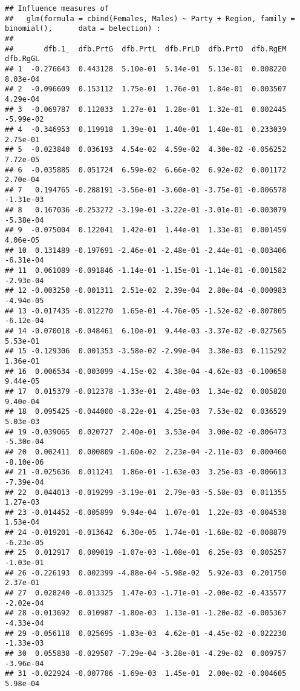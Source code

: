 \documentclass[
]{article}
\begin{document}
\begin{verbatim}
## Influence measures of
##   glm(formula = cbind(Females, Males) ~ Party + Region, family = binomial(),      data = belection) :
## 
##       dfb.1_  dfb.PrtG  dfb.PrtL  dfb.PrLD  dfb.PrtO  dfb.RgEM  dfb.RgGL
## 1  -0.276643  0.443128  5.10e-01  5.14e-01  5.13e-01  0.008220  8.03e-04
## 2  -0.096609  0.153112  1.75e-01  1.76e-01  1.84e-01  0.003507  4.29e-04
## 3  -0.069787  0.112033  1.27e-01  1.28e-01  1.32e-01  0.002445 -5.99e-02
## 4  -0.346953  0.119918  1.39e-01  1.40e-01  1.48e-01  0.233039  2.75e-01
## 5  -0.023840  0.036193  4.54e-02  4.59e-02  4.30e-02 -0.056252  7.72e-05
## 6  -0.035885  0.051724  6.59e-02  6.66e-02  6.92e-02  0.001172  2.70e-04
## 7   0.194765 -0.288191 -3.56e-01 -3.60e-01 -3.75e-01 -0.006578 -1.31e-03
## 8   0.167036 -0.253272 -3.19e-01 -3.22e-01 -3.01e-01 -0.003079 -5.38e-04
## 9  -0.075004  0.122041  1.42e-01  1.44e-01  1.33e-01  0.001459  4.06e-05
## 10  0.131489 -0.197691 -2.46e-01 -2.48e-01 -2.44e-01 -0.003406 -6.31e-04
## 11  0.061089 -0.091846 -1.14e-01 -1.15e-01 -1.14e-01 -0.001582 -2.93e-04
## 12 -0.003250 -0.001311  2.51e-02  2.39e-04  2.80e-04 -0.000983 -4.94e-05
## 13 -0.017435 -0.012270  1.65e-01 -4.76e-05 -1.52e-02 -0.007805 -6.12e-04
## 14 -0.070018 -0.048461  6.10e-01  9.44e-03 -3.37e-02 -0.027565  5.53e-01
## 15 -0.129306  0.001353 -3.58e-02 -2.99e-04  3.38e-03  0.115292  1.36e-01
## 16  0.006534 -0.003099 -4.15e-02  4.38e-04 -4.62e-03 -0.100658  9.44e-05
## 17  0.015379 -0.012378 -1.33e-01  2.48e-03  1.34e-02  0.005820  9.40e-04
## 18  0.095425 -0.044000 -8.22e-01  4.25e-03  7.53e-02  0.036529  5.03e-03
## 19 -0.039065  0.020727  2.40e-01  3.53e-04  3.00e-02 -0.006473 -5.30e-04
## 20  0.002411  0.000809 -1.60e-02  2.23e-04 -2.11e-03  0.000460 -8.10e-06
## 21 -0.025636  0.011241  1.86e-01 -1.63e-03  3.25e-03 -0.006613 -7.39e-04
## 22  0.044013 -0.019299 -3.19e-01  2.79e-03 -5.58e-03  0.011355  1.27e-03
## 23 -0.014452 -0.005899  9.94e-04  1.07e-01  1.22e-03 -0.004538  1.53e-04
## 24 -0.019201 -0.013642  6.30e-05  1.74e-01 -1.68e-02 -0.008879 -6.23e-05
## 25  0.012917  0.009019 -1.07e-03 -1.08e-01  6.25e-03  0.005257 -1.03e-01
## 26 -0.226193  0.002399 -4.88e-04 -5.98e-02  5.92e-03  0.201750  2.37e-01
## 27  0.028240 -0.013325  1.47e-03 -1.71e-01 -2.00e-02 -0.435577 -2.02e-04
## 28 -0.013692  0.010987 -1.80e-03  1.13e-01 -1.20e-02 -0.005367 -4.33e-04
## 29 -0.056118  0.025695 -1.83e-03  4.62e-01 -4.45e-02 -0.022230 -1.33e-03
## 30  0.055838 -0.029507 -7.29e-04 -3.28e-01 -4.29e-02  0.009757 -3.96e-04
## 31 -0.022924 -0.007786 -1.69e-03  1.45e-01  2.00e-02 -0.004605  5.98e-04

\end{verbatim}
\end{document}
